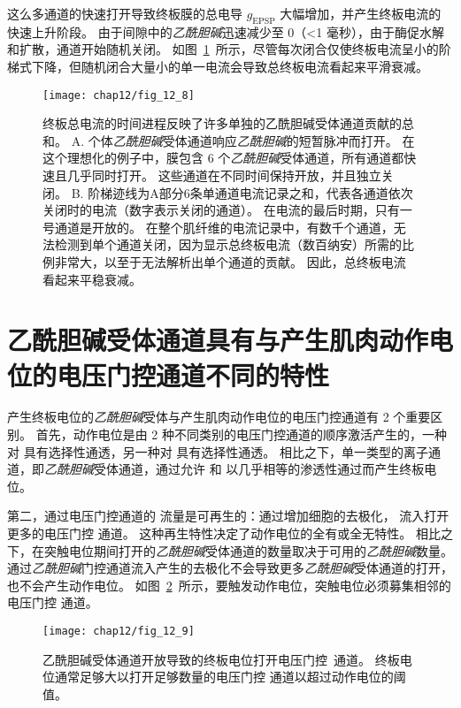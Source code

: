 这么多通道的快速打开导致终板膜的总电导 $ g_{\text{EPSP}} $ 大幅增加，并产生终板电流的快速上升阶段。
由于间隙中的\textit{乙酰胆碱}迅速减少至 0（<1 毫秒），由于酶促水解和扩散，通道开始随机关闭。
如图~\ref{fig:12_8}~所示，尽管每次闭合仅使终板电流呈小的阶梯式下降，但随机闭合大量小的单一电流会导致总终板电流看起来平滑衰减。


\begin{figure}[htbp]
	\centering
	\texttt{[image: chap12/fig\_12\_8]}
	\caption{终板总电流的时间进程反映了许多单独的乙酰胆碱受体通道贡献的总和\cite{colquhoun1981fast}。
		A. 个体\textit{乙酰胆碱}受体通道响应\textit{乙酰胆碱}的短暂脉冲而打开。
		在这个理想化的例子中，膜包含 6 个\textit{乙酰胆碱}受体通道，所有通道都快速且几乎同时打开。
		这些通道在不同时间保持开放，并且独立关闭。
		B. 阶梯迹线为A部分6条单通道电流记录之和，代表各通道依次关闭时的电流（数字表示关闭的通道）。
		在电流的最后时期，只有一号通道是开放的。
		在整个肌纤维的电流记录中，有数千个通道，无法检测到单个通道关闭，因为显示总终板电流（数百纳安）所需的比例非常大，以至于无法解析出单个通道的贡献。
		因此，总终板电流看起来平稳衰减。}
	\label{fig:12_8}
\end{figure}



\section{乙酰胆碱受体通道具有与产生肌肉动作电位的电压门控通道不同的特性}

产生终板电位的\textit{乙酰胆碱}受体与产生肌肉动作电位的电压门控通道有 2 个重要区别。
首先，动作电位是由 2 种不同类别的电压门控通道的顺序激活产生的，一种对  具有选择性通透，另一种对  具有选择性通透。
相比之下，单一类型的离子通道，即\textit{乙酰胆碱}受体通道，通过允许  和  以几乎相等的渗透性通过而产生终板电位。


第二，通过电压门控通道的  流量是可再生的：通过增加细胞的去极化， 流入打开更多的电压门控  通道。
这种再生特性决定了动作电位的全有或全无特性。
相比之下，在突触电位期间打开的\textit{乙酰胆碱}受体通道的数量取决于可用的\textit{乙酰胆碱}数量。
 通过\textit{乙酰胆碱}门控通道流入产生的去极化不会导致更多\textit{乙酰胆碱}受体通道的打开，也不会产生动作电位。
如图~\ref{fig:12_9}~所示，要触发动作电位，突触电位必须募集相邻的电压门控  通道。


\begin{figure}[htbp]
	\centering
	\texttt{[image: chap12/fig\_12\_9]}
	\caption{乙酰胆碱受体通道开放导致的终板电位打开电压门控~通道。
		终板电位通常足够大以打开足够数量的电压门控  通道以超过动作电位的阈值\cite{alberts2017molecular}。}
	\label{fig:12_9}
\end{figure}


